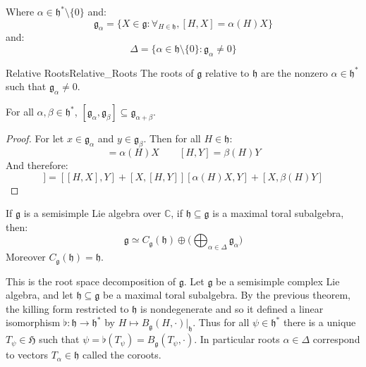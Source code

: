 \documentclass[crop=false,class=article]{standalone}                           %
\begin{document}
        Where $\alpha\in\mathfrak{h}^{*}\setminus\{0\}$ and:
        \begin{equation}
            \mathfrak{g}_{\alpha}
            =\{X\in\mathfrak{g}:\forall_{H\in\mathfrak{h}},[H,X]=\alpha(H)X\}
        \end{equation}
        and:
        \begin{equation}
            \Delta=\{\alpha\in\mathfrak{h}\setminus\{0\}:
                \mathfrak{g}_{\alpha}\ne{0}\}
        \end{equation}
        \begin{fdefinition}{Relative Roots}{Relative_Roots}
            The roots of $\mathfrak{g}$ relative to $\mathfrak{h}$ are the
            nonzero $\alpha\in\mathfrak{h}^{*}$ such that
            $\mathfrak{g}_{\alpha}\ne{0}$.
        \end{fdefinition}
        \begin{theorem}
            For all $\alpha,\beta\in\mathfrak{h}^{*}$,
            $[\mathfrak{g}_{\alpha},\mathfrak{g}_{\beta}]\subseteq
            \mathfrak{g}_{\alpha+\beta}$.
        \end{theorem}
        \begin{proof}
            For let $x\in\mathfrak{g}_{\alpha}$ and $y\in\mathfrak{g}_{\beta}$.
            Then for all $H\in\mathfrak{h}$:
            \begin{equation}
                [H,X]=\alpha(H)X
                \quad\quad
                [H,Y]=\beta(H)Y
            \end{equation}
            And therefore:
            \begin{equation}
                [H,[X,Y]]=
                [[H,X],Y]+[X,[H,Y]]
                [\alpha(H)X,Y]+[X,\beta(H)Y]
            \end{equation}
        \end{proof}
        \begin{theorem}
            If $\mathfrak{g}$ is a semisimple Lie algebra over $\mathbb{C}$, if
            $\mathfrak{h}\subseteq\mathfrak{g}$ is a maximal toral subalgebra,
            then:
            \begin{equation}
                \mathfrak{g}\simeq{C}_{\mathfrak{g}}(\mathfrak{h})\oplus
                \Big(\bigoplus_{\alpha\in\Delta}\mathfrak{g}_{\alpha}\Big)
            \end{equation}
            Moreover $C_{\mathfrak{g}}(\mathfrak{h})=\mathfrak{h}$.
        \end{theorem}
        This is the root space decomposition of $\mathfrak{g}$. Let
        $\mathfrak{g}$ be a semisimple complex Lie algebra, and let
        $\mathfrak{h}\subseteq\mathfrak{g}$ be a maximal toral subalgebra.
        By the previous theorem, the killing form restricted to
        $\mathfrak{h}$ is nondegenerate and so it defined a linear isomorphism
        $\flat:\mathfrak{h}\rightarrow\mathfrak{h}^{*}$ by
        $H\mapsto{B}_{\mathfrak{g}}(H,\cdot)|_{\mathfrak{h}}$. Thus for all
        $\psi\in\mathfrak{h}^{*}$ there is a unique $T_{\psi}\in\mathfrak{H}$
        such that $\psi=\flat(T_{\psi})=B_{\mathfrak{g}}(T_{\psi},\cdot)$.
        In particular roots $\alpha\in\Delta$ correspond to vectors
        $T_{\alpha}\in\mathfrak{h}$ called the coroots.
\end{document}
